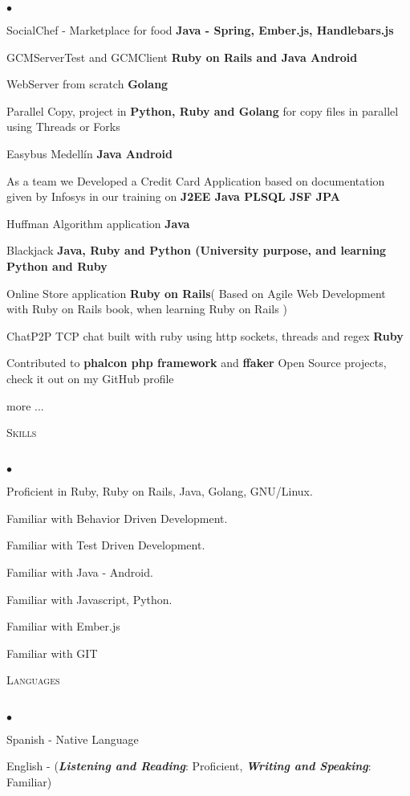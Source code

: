 \documentclass[a4paper]{article}
\newcommand{\lineunder}{\vspace*{-8pt} \\ \hspace*{-18pt} \hrulefill \\}
\newcommand{\header}[1]{{\hspace*{-15pt}\vspace*{6pt}
\textsc{#1}} \vspace*{-6pt} \lineunder}
\newenvironment{achievements}{\begin{list}{$\bullet$}{\topsep 0pt \itemsep
-2pt}}{\vspace*{4pt}\end{list}}
\newcommand{\programming}[1]{{\textbf{#1}}}
\newcommand{\emphasys}[1]{\textbf{\emph{#1}}}
\begin{document}
\begin{achievements}
\item{SocialChef - Marketplace for food} \programming{Java - Spring, Ember.js, Handlebars.js}
\item{GCMServerTest and GCMClient} \programming{Ruby on Rails and Java Android}
\item{WebServer from scratch} \programming{Golang}
\item{Parallel Copy, project in \programming{Python, Ruby and Golang} for copy files in parallel using Threads or Forks}
\item{Easybus Medell\'in }\programming{Java Android}
\item{As a team we Developed a Credit Card Application based on documentation given by Infosys in our training on \programming{J2EE Java PLSQL JSF JPA}}
\item{Huffman Algorithm application \programming{Java}}
\item{Blackjack \programming{Java, Ruby and Python (University purpose, and learning Python and Ruby}}
\item{Online Store application \programming{Ruby on Rails}( Based on Agile Web Development with Ruby on Rails book, when learning Ruby on Rails )}
\item{ChatP2P TCP chat built with ruby using http sockets, threads and regex \programming{Ruby}}
\item{Contributed to \programming{phalcon php framework} and \programming{ffaker} Open Source projects, check it out on my GitHub profile}
\item{more ...}
\end{achievements}
\newpage
\header{Skills}
\begin{achievements}
\item {Proficient in Ruby, Ruby on Rails, Java, Golang, GNU/Linux.}
\item {Familiar with Behavior Driven Development.}
\item {Familiar with Test Driven Development.}
\item {Familiar with Java - Android.}
\item {Familiar with Javascript, Python.}
\item {Familiar with Ember.js}
\item {Familiar with GIT}
\end{achievements}
\header{Languages}
\begin{achievements}
\item{Spanish - Native Language}
\item{English - (\emphasys{Listening and Reading}: Proficient, \emphasys{Writing and Speaking}: Familiar)}
\end{achievements}
\end{document}

